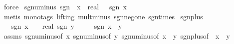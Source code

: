 \begin{isabellebody}
\isamarkupfalse%
\ {\isacharparenleft}{\kern0pt}force{\isacharparenright}{\kern0pt}%
\endisatagproof
{\isafoldproof}%
%
\isadelimproof
\isanewline
%
\endisadelimproof
\isanewline
{}\isamarkupfalse%
\ sgn{\isacharunderscore}{\kern0pt}uminus{\isacharcolon}{\kern0pt}\ {\isachardoublequoteopen}sgn\ {\isacharparenleft}{\kern0pt}{\isacharminus}{\kern0pt}\ {\isacharparenleft}{\kern0pt}x\ {\isacharcolon}{\kern0pt}{\isacharcolon}{\kern0pt}\ real{\isacharparenright}{\kern0pt}{\isacharparenright}{\kern0pt}\ {\isacharequal}{\kern0pt}\ {\isacharminus}{\kern0pt}\ sgn\ x{\isachardoublequoteclose}%
\isadelimproof
\ %
\endisadelimproof
%
\isatagproof
{}\isamarkupfalse%
\ {\isacharparenleft}{\kern0pt}metis\ {\isacharparenleft}{\kern0pt}mono{\isacharunderscore}{\kern0pt}tags{\isacharcomma}{\kern0pt}\ lifting{\isacharparenright}{\kern0pt}\ mult{\isacharunderscore}{\kern0pt}minus{}\ sgn{\isacharunderscore}{\kern0pt}neg{\isacharunderscore}{\kern0pt}one\ sgn{\isacharunderscore}{\kern0pt}times{\isacharparenright}{\kern0pt}%
\endisatagproof
{\isafoldproof}%
%
\isadelimproof
%
\endisadelimproof
\isanewline
\isanewline
{}\isamarkupfalse%
\ sgn{\isacharunderscore}{\kern0pt}plus{\isacharprime}{\kern0pt}{\isacharcolon}{\kern0pt}\isanewline
\ \ \ {\isachardoublequoteopen}sgn\ x\ {\isacharequal}{\kern0pt}\ {\isacharparenleft}{\kern0pt}{\isacharminus}{\kern0pt}{}\ {\isacharcolon}{\kern0pt}{\isacharcolon}{\kern0pt}\ real{\isacharparenright}{\kern0pt}{\isachardoublequoteclose}\ {\isachardoublequoteopen}sgn\ y\ {\isacharequal}{\kern0pt}\ {\isacharminus}{\kern0pt}{}{\isachardoublequoteclose}\isanewline
\ \ \ {\isachardoublequoteopen}sgn\ {\isacharparenleft}{\kern0pt}x\ {\isacharplus}{\kern0pt}\ y{\isacharparenright}{\kern0pt}\ {\isacharequal}{\kern0pt}\ {\isacharminus}{\kern0pt}{}{\isachardoublequoteclose}\isanewline
%
\isadelimproof
\ \ %
\endisadelimproof
%
\isatagproof
{}\isamarkupfalse%
\ assms\ sgn{\isacharunderscore}{\kern0pt}uminus{\isacharbrackleft}{\kern0pt}of\ x{\isacharbrackright}{\kern0pt}\ sgn{\isacharunderscore}{\kern0pt}uminus{\isacharbrackleft}{\kern0pt}of\ y{\isacharbrackright}{\kern0pt}\ sgn{\isacharunderscore}{\kern0pt}uminus{\isacharbrackleft}{\kern0pt}of\ {\isachardoublequoteopen}x\ {\isacharplus}{\kern0pt}\ y{\isachardoublequoteclose}{\isacharbrackright}{\kern0pt}\ sgn{\isacharunderscore}{\kern0pt}plus{\isacharbrackleft}{\kern0pt}of\ {\isachardoublequoteopen}{\isacharminus}{\kern0pt}\ x{\isachardoublequoteclose}\ {\isachardoublequoteopen}{\isacharminus}{\kern0pt}\ y{\isachardoublequoteclose}{\isacharbrackright}{\kern0pt}\isanewline

\end{isabellebody}
